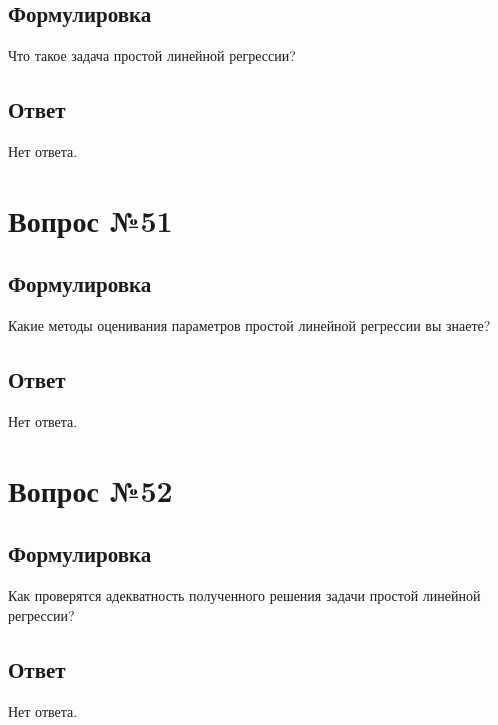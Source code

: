 \documentclass[a4]{article}
\begin{document}
	\subsection*{Формулировка}
	Что такое задача простой линейной регрессии?
	\subsection*{Ответ}
	Нет ответа.
	
	\section{Вопрос №51}
	\subsection*{Формулировка}
	Какие методы оценивания параметров простой линейной регрессии вы знаете?
	\subsection*{Ответ}
	Нет ответа.
	
	\section{Вопрос №52}
	\subsection*{Формулировка}
	Как проверятся адекватность полученного решения задачи простой линейной регрессии?
	\subsection*{Ответ}
	Нет ответа.
	
\end{document}
